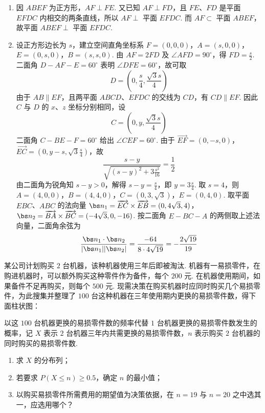 \begin{solution}
\begin{enumerate}
\item 因 \(ABEF\) 为正方形，\(AF\perp FE\). 又已知 \(AF\perp FD\)，且 \(FE\)、\(FD\) 是平面 \(EFDC\) 内相交的两条直线，所以 \(AF\perp\) 平面 \(EFDC\). 而 \(AF\subset\) 平面 \(ABEF\)，故平面 \(ABEF\perp\) 平面 \(EFDC\).
\item 设正方形边长为 \(s\)，建立空间直角坐标系
\(F=(0,0,0)\)，\(A=(s,0,0)\)，\(E=(0,s,0)\)，\(B=(s,s,0)\).
由 \(AF=2FD\) 及 \(\angle AFD=90^\circ\)，得 \(FD=\frac{s}{2}\). 二面角 \(D-AF-E=60^\circ\) 表明 \(\angle DFE=60^\circ\)，故可取
\[
D=\left(0,\frac{s}{4},\frac{\sqrt3s}{4}\right)
\]
由于 \(AB\parallel EF\)，且两平面 \(ABCD\)、\(EFDC\) 的交线为 \(CD\)，有 \(CD\parallel EF\). 因此 \(C\) 与 \(D\) 的 \(x\)、\(z\) 坐标分别相同，设
\[
C=\left(0,y,\frac{\sqrt3s}{4}\right)
\]
二面角 \(C-BE-F=60^\circ\) 给出 \(\angle CEF=60^\circ\). 由于 \(\overrightarrow{EF}=(0,-s,0)\)，\(\overrightarrow{EC}=(0,y-s,\sqrt3\frac{s}{4})\)，故
\[
\frac{s-y}{\sqrt{(s-y)^2+3\frac{s^2}{16}}}=\frac12
\]
由二面角为锐角知 \(s-y>0\)，解得 \(s-y=\frac{s}{4}\)，即 \(y=3\frac{s}{4}\). 取 \(s=4\)，则
\(A=(4,0,0)\)，\(B=(4,4,0)\)，\(C=(0,3,\sqrt3)\)，\(E=(0,4,0)\).
取平面 \(EBC\)、\(ABC\) 的法向量
\(\bs n_1=\overrightarrow{EC}\times\overrightarrow{EB}=(0,4\sqrt3,4)\)，\(\bs n_2=\overrightarrow{BA}\times\overrightarrow{BC}=(-4\sqrt3,0,-16)\).
按二面角 \(E-BC-A\) 的两侧取上述法向量，二面角余弦为
\[
\frac{\bs n_1\cdot\bs n_2}{|\bs n_1||\bs n_2|}
=\frac{-64}{8\cdot4\sqrt{19}}
=-\frac{2\sqrt{19}}{19}
\]
\end{enumerate}
\end{solution}


\begin{problem}
某公司计划购买 \(2\) 台机器，该种机器使用三年后即被淘汰. 机器有一易损零件，在购进机器时，可以额外购买这种零件作为备件，每个 \(200\) 元. 在机器使用期间，如果备件不足再购买，则每个 \(500\) 元. 现需决策在购买机器时应同时购买几个易损零件，为此搜集并整理了 \(100\) 台这种机器在三年使用期内更换的易损零件数，得下面柱状图：

以这 \(100\) 台机器更换的易损零件数的频率代替 \(1\) 台机器更换的易损零件数发生的概率，记 \(X\) 表示 \(2\) 台机器三年内共需更换的易损零件数，\(n\) 表示购买 \(2\) 台机器的同时购买的易损零件数.

\begin{enumerate}
\item 求 \(X\) 的分布列；
\item 若要求 \(P(X\le n)\ge 0.5\)，确定 \(n\) 的最小值；
\item 以购买易损零件所需费用的期望值为决策依据，在 \(n=19\) 与 \(n=20\) 之中选其一，应选用哪个？
\end{enumerate}

\end{problem}

